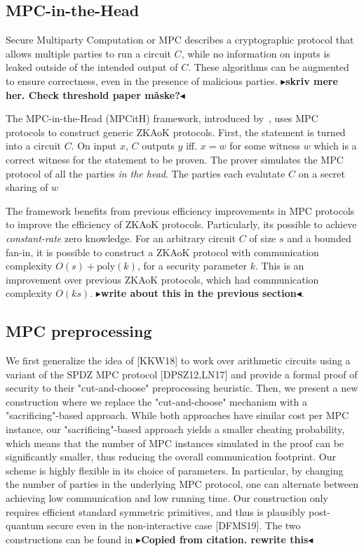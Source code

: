 \documentclass[twoside,11pt,openright]{report}
\theoremstyle{definition}
\theoremstyle{plain}
\newcommand{\todo}[1]{{\color[rgb]{.5,0,0}\textbf{$\blacktriangleright$#1$\blacktriangleleft$}}}
\begin{document}
\subsection{MPC-in-the-Head}
\label{sec:mpcith}

Secure Multiparty Computation or MPC describes a cryptographic protocol that allows multiple parties to run a circuit $C$, while no information on inputs is leaked outside of the intended output of $C$. These algorithms can be augmented to ensure correctness, even in the presence of malicious parties. \todo{skriv mere her. Check threshold paper måske?}

The MPC-in-the-Head (MPCitH) framework, introduced by~\cite{ishai2007zero}, uses MPC protocols to construct generic ZKAoK protocols. First, the statement is turned into a circuit $C$. On input $x$, $C$ outputs $y$ iff. $x = w$ for some witness $w$ which is a correct witness for the statement to be proven. The prover simulates the MPC protocol of all the parties \textit{in the head}. The parties each evalutate $C$ on a secret sharing of $w$

The framework benefits from previous efficiency improvements in MPC protocols to improve the efficiency of ZKAoK protocols. Particularly, its possible to achieve \textit{constant-rate} zero knowledge. For an arbitrary circuit $C$ of size $s$ and a bounded fan-in, it is possible to construct a ZKAoK protocol with communication complexity $O(s) + \text{poly}(k)$, for a security parameter $k$. This is an improvement over previous ZKAoK protocols, which had communication complexity $O(ks)$. \todo{write about this in the previous section}.

\subsection{MPC preprocessing}

We first generalize the idea of [KKW18] to work over arithmetic circuits using a variant of the SPDZ MPC protocol [DPSZ12,LN17] and provide a formal proof of security to their "cut-and-choose" preprocessing heuristic. Then, we present a new construction where we replace the "cut-and-choose" mechanism with a "sacrificing"-based approach. While both approaches have similar cost per MPC instance, our "sacrificing"-based approach yields a smaller cheating probability, which means that the number of MPC instances simulated in the proof can be significantly smaller, thus reducing the overall communication footprint. Our scheme is highly flexible in its choice of parameters. In particular, by changing the number of parties in the underlying MPC protocol, one can alternate between achieving low communication and low running time. Our construction only requires efficient standard symmetric primitives, and thus is plausibly post-quantum secure even in the non-interactive case [DFMS19]. The two constructions can be found in \cite{baum2020concretely} \todo{Copied from citation. rewrite this}
\end{document}
